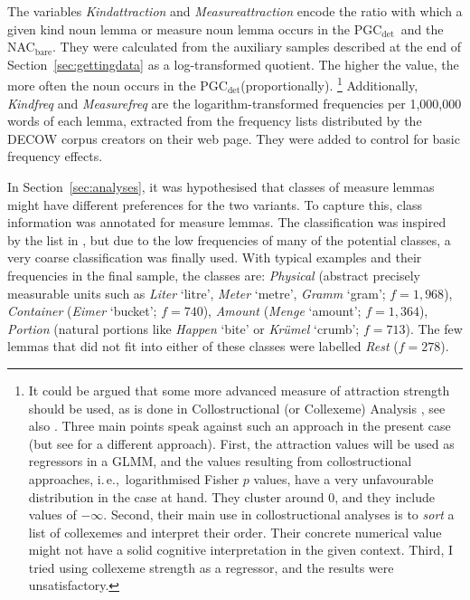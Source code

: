 \documentclass[USenglish]{article}
\newcommand{\ie}{i.\,e.,}
\newcommand{\Sub}[1]{\ensuremath{\mathrm{_{#1}}}}
\newcommand{\NACb}{NAC\Sub{bare}}
\newcommand{\PGCd}{PGC\Sub{det}}
\begin{document}
The variables \textit{Kindattraction} and \textit{Measureattraction} encode the ratio with which a given kind noun lemma or measure noun lemma occurs in the \PGCd\ and the  \NACb.
They were calculated from the auxiliary samples described at the end of Section~\ref{sec:gettingdata} as a log-transformed quotient.
The higher the value, the more often the noun occurs in the \PGCd (proportionally).%
\footnote{
  It could be argued that some more advanced measure of attraction strength should be used, as is done in Collostructional (or Collexeme) Analysis \citep{GriesStefanowitsch2004}, see also \cite{Gries2015a}.
  Three main points speak against such an approach in the present case (but see \citealp[246--249]{Levshina2016} for a different approach).
  First, the attraction values will be used as regressors in a GLMM, and the values resulting from collostructional approaches, \ie\ logarithmised Fisher $p$ values, have a very unfavourable distribution in the case at hand.
  They cluster around $0$, and they include values of $-\infty$.
  Second, their main use in collostructional analyses is to \textit{sort} a list of collexemes and interpret their order.
  Their concrete numerical value might not have a solid cognitive interpretation in the given context.
  Third, I tried using collexeme strength as a regressor, and the results were unsatisfactory.
}
Additionally, \textit{Kindfreq} and \textit{Measurefreq} are the logarithm-transformed frequencies per 1,000,000 words of each lemma, extracted from the frequency lists distributed by the DECOW corpus creators on their web page.
They were added to control for basic frequency effects.

In Section~\ref{sec:analyses}, it was hypothesised that classes of measure lemmas might have different preferences for the two variants.
To capture this, class information was annotated for measure lemmas.
The classification was inspired by the list in \citet[530]{Koptjevskaja2001}, but due to the low frequencies of many of the potential classes, a very coarse classification was finally used.
With typical examples and their frequencies in the final sample, the classes are:
\textit{Physical} (abstract precisely measurable units such as \textit{Liter} `litre', \textit{Meter} `metre', \textit{Gramm} `gram'; $f=1,968$),
\textit{Container} (\textit{Eimer} `bucket'; $f=740$), 
\textit{Amount} (\textit{Menge} `amount'; $f=1,364$), 
\textit{Portion} (natural portions like \textit{Happen} `bite' or \textit{Krümel} `crumb'; $f=713$).
The few lemmas that did not fit into either of these classes were labelled \textit{Rest} ($f=278$).
\end{document}
